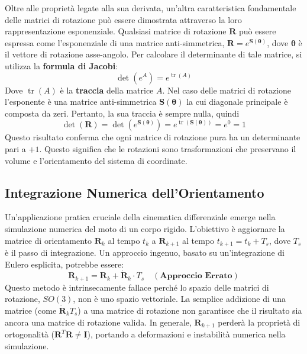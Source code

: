 ﻿\documentclass[11pt, a4paper]{article}
\begin{document}
Oltre alle proprietà legate alla sua derivata, un'altra caratteristica fondamentale delle matrici di rotazione può essere dimostrata attraverso la loro rappresentazione esponenziale. Qualsiasi matrice di rotazione \(\bm{R}\) può essere espressa come l'esponenziale di una matrice anti-simmetrica, \(\bm{R} = e^{\bm{S}(\bm{\theta})}\), dove \(\bm{\theta}\) è il vettore di rotazione asse-angolo. Per calcolare il determinante di tale matrice, si utilizza la \textbf{formula di Jacobi}:
\[
    \det(e^A) = e^{\operatorname{tr}(A)}
\]
Dove \(\operatorname{tr}(A)\) è la \textbf{traccia} della matrice \(A\). Nel caso delle matrici di rotazione l'esponente è una matrice anti-simmetrica \(\bm{S}(\bm{\theta})\) la cui diagonale principale è composta da zeri. Pertanto, la sua traccia è sempre nulla, quindi
\[
    \det(\bm{R}) = \det(e^{\bm{S}(\bm{\theta})}) = e^{\operatorname{tr}(\bm{S}(\bm{\theta}))} = e^0 = 1
\]
Questo risultato conferma che ogni matrice di rotazione pura ha un determinante pari a \(+1\). Questo significa che le rotazioni sono trasformazioni che preservano il volume e l'orientamento del sistema di coordinate.
\newpage
\subsection{Integrazione Numerica dell'Orientamento}
Un'applicazione pratica cruciale della cinematica differenziale emerge nella simulazione numerica del moto di un corpo rigido. L'obiettivo è aggiornare la matrice di orientamento \(\bm{R}_k\) al tempo \(t_k\) a \(\bm{R}_{k+1}\) al tempo \(t_{k+1} = t_k + T_s\), dove \(T_s\) è il passo di integrazione. Un approccio ingenuo, basato su un'integrazione di Eulero esplicita, potrebbe essere:
\[
    \bm{R}_{k+1} = \bm{R}_k + \dot{\bm{R}}_k \cdot T_s \quad (\textbf{Approccio Errato})
\]
Questo metodo è intrinsecamente fallace perché lo spazio delle matrici di rotazione, \(SO(3)\), non è uno spazio vettoriale. La semplice addizione di una matrice (come \(\dot{\bm{R}}_k T_s\)) a una matrice di rotazione non garantisce che il risultato sia ancora una matrice di rotazione valida. In generale, \(\bm{R}_{k+1}\) perderà la proprietà di ortogonalità (\(\bm{R}^T\bm{R} \neq \bm{I}\)), portando a deformazioni e instabilità numerica nella simulazione.
\end{document}
